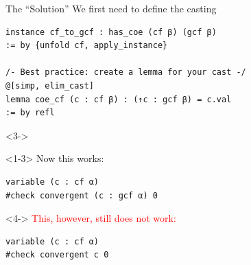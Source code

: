 \documentclass{beamer}
\begin{document}
\begin{frame}[fragile]{The ``Solution''}
We first need to define the casting
\pause
\begin{verbatim}
instance cf_to_gcf : has_coe (cf β) (gcf β)
:= by {unfold cf, apply_instance}

/- Best practice: create a lemma for your cast -/
@[simp, elim_cast]
lemma coe_cf (c : cf β) : (↑c : gcf β) = c.val
:= by refl
\end{verbatim}
\begin{visibleenv}<3->
\begin{onlyenv}<1-3>
\alert{Now this works:}
\begin{verbatim}
variable (c : cf α)
#check convergent (c : gcf α) 0
\end{verbatim}
\end{onlyenv}
\begin{onlyenv}<4->
\textcolor{red}{This, however, still does not work:}
\begin{verbatim}
variable (c : cf α)
#check convergent c 0
\end{verbatim}
\end{onlyenv}
\end{visibleenv}
\end{frame}
\end{document}
